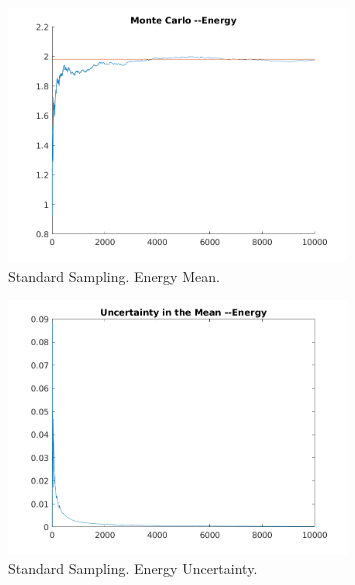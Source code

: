 \documentclass{article}
\begin{document}
\begin{enumerate}
\begin{enumerate}
        \begin{figure}[H]
          \centering
          \includegraphics[width=0.8\textwidth]{standard_energy_mean}
          \caption{Standard Sampling. Energy Mean.}
          \label{fig:standard_energy_mean}
        \end{figure}

        \begin{figure}[H]
          \centering
          \includegraphics[width=0.8\textwidth]{standard_energy_uncertainty}
          \caption{Standard Sampling. Energy Uncertainty.}
          \label{fig:standard_energy_uncertainty}
        \end{figure}


\end{enumerate}
\end{enumerate}
\end{document}
